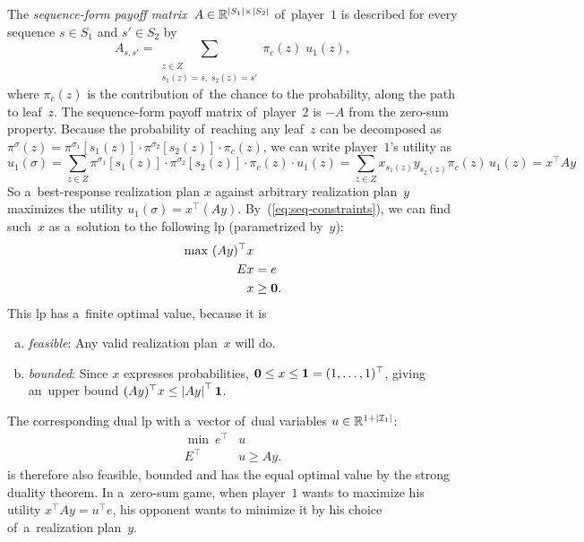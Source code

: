 The \emph{sequence-form payoff matrix}~$A \in \mathbb{R} ^{\left\vert S_1 \right\vert \times \left\vert S_2 \right\vert}$ of~player~$1$ is described for every sequence $s \in S_1$ and $s' \in S_2$ by
\[
  A _{s,s'} = \sum _{\substack{z \in Z\\ s_1(z) = s,\; s_2(z) = s'}} \pi_c (z) \; u_1(z),
\]
where $\pi_c (z)$ is the contribution of~the chance to the probability, along the path to leaf~$z$.
The sequence-form payoff matrix of~player~$2$ is $-A$ from the zero-sum property.
Because the probability of~reaching any leaf~$z$ can be decomposed as
$
\pi^\sigma(z) =
\pi^{\sigma_1}[s_1(z)] \cdot
\pi^{\sigma_2}[s_2(z)] \cdot
\pi_c(z)
$,
we can write player~$1$'s utility as
\[
  u_1(\sigma)
  = \sum _{z \in Z}
  \pi^{\sigma_1}[s_1(z)] \cdot
  \pi^{\sigma_2}[s_2(z)] \cdot
  \pi_c(z) \cdot
  u_1(z)
  = \sum _{z \in Z}
  x_{s_1(z)}
  y_{s_2(z)}
  \pi_c(z) \,
  u_1(z)
  = x ^\top A y
\]
So a~best-response realization plan $x$ against arbitrary realization plan~$y$ maximizes the utility $u_1(\sigma) = x ^\top (Ay)$.
By~(\ref{eq:seq-constraints}), we can find such~$x$ as a~solution to the following \acrshort{lp} (parametrized by~$y$):
\begin{equation}
  \label{lp:seq-primal-param}
  \begin{split}
    \max\ (Ay)^\top &x \\
    E&x = e \\
    &x \ge \boldsymbol{0}.
  \end{split}
\end{equation}
This \acrshort{lp} has a~finite optimal value, because it is
\begin{enumerate}[(a)]
  \item \emph{feasible}: Any valid realization plan~$x$ will do.
  \item \emph{bounded}: Since $x$ expresses probabilities, $\boldsymbol{0} \le x \le \boldsymbol{1} = (1, \dots, 1)^\top$, giving an~upper bound $(Ay)^\top x \le \left\vert Ay \right\vert ^\top \boldsymbol{1}$.
\end{enumerate}
The corresponding dual \acrshort{lp} with a~vector of~dual variables $u \in \mathbb{R}^{1 + \left\vert \mathcal{I}_1 \right\vert}$:
\begin{equation}
  \label{lp:seq-dual-param}
  \begin{split}
    \min\  e^\top &u \\
    E^\top &u \ge Ay.
  \end{split}
\end{equation}
is therefore also feasible, bounded and has the equal optimal value by the strong duality theorem.
In a~zero-sum game, when player~$1$ wants to maximize his utility $x^\top Ay = u^\top e$, his opponent wants to minimize it by his choice of~a~realization plan~$y$.
